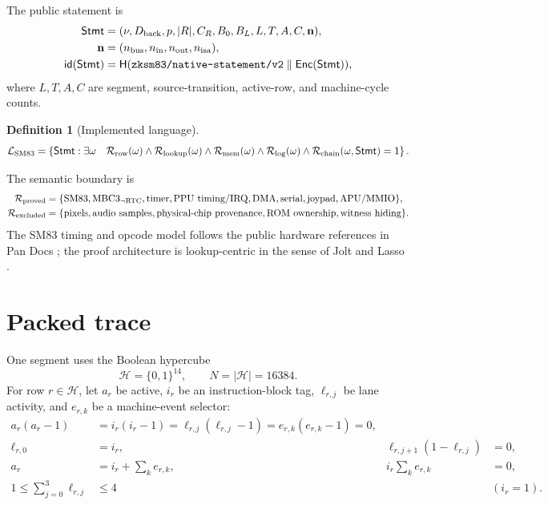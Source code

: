 \documentclass[10pt]{article}
\numberwithin{equation}{section}
\newcommand{\B}{\{0,1\}}
\newcommand{\Enc}{\mathsf{Enc}}
\newcommand{\Hash}{\mathsf{H}}
\newcommand{\Stmt}{\mathsf{Stmt}}
\newcommand{\Rel}{\mathcal{R}}
\newcommand{\Lang}{\mathcal{L}}
\newcommand{\code}[1]{\texttt{#1}}
\newtheorem{definition}{Definition}
\begin{document}
The public statement is
\begin{align}
 \Stmt={}&(\nu,D_{\rm back},p,|R|,C_R,B_0,B_L,L,T,A,C,\mathbf n), \\
 \mathbf n={}&(n_{\rm bus},n_{\rm in},n_{\rm out},n_{\rm isa}), \\
 \mathsf{id}(\Stmt)={}&\Hash(\code{zksm83/native-statement/v2}\parallel\Enc(\Stmt)),
 \label{eq:statement}
\end{align}
where $L,T,A,C$ are segment, source-transition, active-row, and machine-cycle counts.

\begin{definition}[Implemented language]
\begin{equation}
\Lang_{\rm SM83}=\left\{\Stmt:\exists\omega\quad
\Rel_{\rm row}(\omega)\wedge
\Rel_{\rm lookup}(\omega)\wedge
\Rel_{\rm mem}(\omega)\wedge
\Rel_{\rm log}(\omega)\wedge
\Rel_{\rm chain}(\omega,\Stmt)=1\right\}.
\end{equation}
\end{definition}

The semantic boundary is
\begin{align}
 \Rel_{\rm proved}={}&
 \{\text{SM83},\text{MBC3}_{\neg\rm RTC},\text{timer},\text{PPU timing/IRQ},
 \text{DMA},\text{serial},\text{joypad},\text{APU/MMIO}\},\\
 \Rel_{\rm excluded}={}&
 \{\text{pixels},\text{audio samples},\text{physical-chip provenance},
 \text{ROM ownership},\text{witness hiding}\}.
 \label{eq:scope}
\end{align}
The SM83 timing and opcode model follows the public hardware references in Pan Docs
\citep{pandocs,gbopcodes}; the proof architecture is lookup-centric in the sense of Jolt and Lasso
\citep{jolt,lasso}.

\section{Packed trace}

One segment uses the Boolean hypercube
\begin{equation}
 \mathcal H=\B^{14},\qquad N=|\mathcal H|=16384.
\end{equation}
For row $r\in\mathcal H$, let $a_r$ be active, $i_r$ be an instruction-block tag,
$\ell_{r,j}$ be lane activity, and $e_{r,k}$ be a machine-event selector:
\begin{align}
 a_r(a_r-1)&=i_r(i_r-1)=\ell_{r,j}(\ell_{r,j}-1)=e_{r,k}(e_{r,k}-1)=0,\\
 \ell_{r,0}&=i_r,
 &\ell_{r,j+1}(1-\ell_{r,j})&=0,\\
 a_r&=i_r+\sum_k e_{r,k},
 &i_r\sum_k e_{r,k}&=0,\\
 1\leq \sum_{j=0}^{3}\ell_{r,j}&\leq4 &&(i_r=1).
 \label{eq:row-tags}
\end{align}
\end{document}
